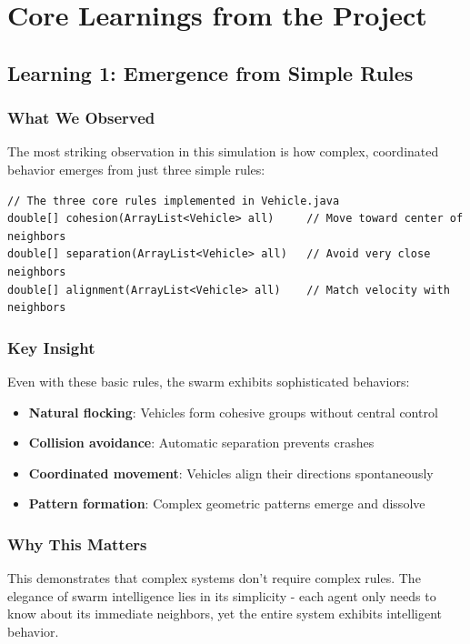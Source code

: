 \documentclass[12pt,a4paper]{article}
\begin{document}
\section{Core Learnings from the Project}

\subsection{Learning 1: Emergence from Simple Rules}

\subsubsection{What We Observed}
The most striking observation in this simulation is how complex, coordinated behavior emerges from just three simple rules:

\begin{lstlisting}
// The three core rules implemented in Vehicle.java
double[] cohesion(ArrayList<Vehicle> all)     // Move toward center of neighbors
double[] separation(ArrayList<Vehicle> all)   // Avoid very close neighbors  
double[] alignment(ArrayList<Vehicle> all)    // Match velocity with neighbors
\end{lstlisting}

\subsubsection{Key Insight}
Even with these basic rules, the swarm exhibits sophisticated behaviors:
\begin{itemize}
    \item \textbf{Natural flocking}: Vehicles form cohesive groups without central control
    \item \textbf{Collision avoidance}: Automatic separation prevents crashes
    \item \textbf{Coordinated movement}: Vehicles align their directions spontaneously
    \item \textbf{Pattern formation}: Complex geometric patterns emerge and dissolve
\end{itemize}

\subsubsection{Why This Matters}
This demonstrates that complex systems don't require complex rules. The elegance of swarm intelligence lies in its simplicity - each agent only needs to know about its immediate neighbors, yet the entire system exhibits intelligent behavior.
\end{document}
